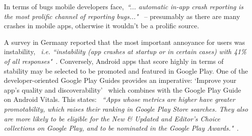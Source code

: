 In terms of bugs mobile developers face,~\emph{``... automatic in-app crash reporting is the most prolific channel of reporting bugs..."}~ %
-- presumably as there are many crashes in mobile apps, otherwise it wouldn't be a prolific source. 

A survey in Germany reported that the most important annoyance for users was instability, ~\emph{i.e. ``instability (app crashes at startup or in certain cases) with 41\% of all responses"}~.  %
%
Conversely, Android apps that score highly in terms of stability may be selected to be promoted and featured in Google Play. One of the developer-oriented Google Play Guides provides an imperative: `Improve your app’s quality and discoverability'~ which combines with the Google Play Guide on Android Vitals. This states: ~\emph{``Apps whose metrics are higher have greater promotability, which raises their ranking in Google Play Store searches. They also are more likely to be eligible for the New \& Updated and Editor's Choice collections on Google Play, and to be nominated in the Google Play Awards."}~. %





